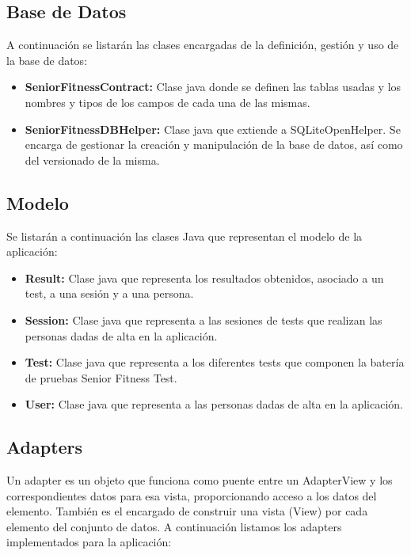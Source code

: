 \subsection{Base de Datos}

A continuación se listarán las clases encargadas de la definición, gestión y uso de la base de datos:

\begin{itemize}
\item \textbf{SeniorFitnessContract:} Clase java donde se definen las tablas usadas y los nombres y tipos de los campos de cada una de las mismas.
\item \textbf{SeniorFitnessDBHelper:} Clase java que extiende a SQLiteOpenHelper. Se encarga de gestionar la creación y manipulación de la base de datos, así como del versionado de la misma.
\end{itemize}

\subsection{Modelo}

Se listarán a continuación las clases Java que representan el modelo de la aplicación:

\begin{itemize}
\item \textbf{Result:} Clase java que representa los resultados obtenidos, asociado a un test, a una sesión y a una persona.
\item \textbf{Session:} Clase java que representa a las sesiones de tests que realizan las personas dadas de alta en la aplicación.
\item \textbf{Test:} Clase java que representa a los diferentes tests que componen la batería de pruebas Senior Fitness Test.
\item \textbf{User:} Clase java que representa a las personas dadas de alta en la aplicación.
\end{itemize}

\subsection{Adapters}

Un adapter es un objeto que funciona como puente entre un AdapterView y los correspondientes datos para esa vista, proporcionando acceso a los datos del elemento. También es el encargado de construir una vista (View) por cada elemento del conjunto de datos. A continuación listamos los adapters implementados para la aplicación:

